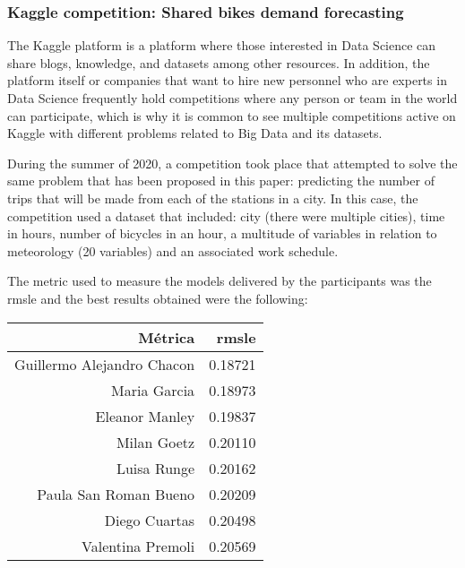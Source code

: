 \subsubsection{Kaggle competition: Shared bikes demand forecasting} \label{kaggle_competition}


The Kaggle platform is a platform where those interested in Data Science can share blogs, knowledge, and datasets among other resources. In addition, the platform itself or companies that want to hire new personnel who are experts in Data Science frequently hold competitions where any person or team in the world can participate, which is why it is common to see multiple competitions active on Kaggle with different problems related to Big Data and its datasets.
\newline


During the summer of 2020, a competition took place \cite{kaggleCompetition} that attempted to solve the same problem that has been proposed in this paper: predicting the number of trips that will be made from each of the stations in a city. In this case, the competition used a dataset that included: city (there were multiple cities), time in hours, number of bicycles in an hour, a multitude of variables in relation to meteorology (20 variables) and an associated work schedule.
\newline

The metric used to measure the models delivered by the participants was the \acrshort{rmsle} and the best results obtained were the following:

\begin{table}[H]
\centering
\begin{tabular}{rr}
\toprule
 Métrica & \acrshort{rmsle} \\
\midrule
 Guillermo Alejandro Chacon &  0.18721 \\
 Maria Garcia &  0.18973 \\
 Eleanor Manley &  0.19837 \\
 Milan Goetz &  0.20110 \\
 Luisa Runge &  0.20162 \\
 Paula San Roman Bueno &  0.20209 \\
 Diego Cuartas &  0.20498 \\
 Valentina Premoli & 0.20569 \\
\bottomrule
\end{tabular}
\end{table}